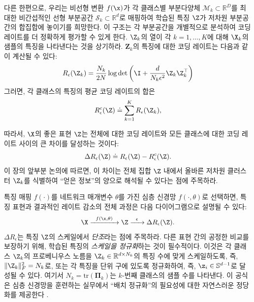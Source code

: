 \documentclass[../../book-main_ko.tex]{subfiles}
\begin{document}
다른 한편으로, 우리는 비선형 변환 $f(\x)$가 각 클래스별 부분다양체 $\mathcal{M}_k \subset \mathbb{R}^D$를 최대한 비간섭적인 선형 부분공간 $\mathcal{S}_k \subset \mathbb{R}^d$로 매핑하여 학습된 특징 $\Z$가 저차원 부분공간의 합집합에 놓이기를 희망한다. 이 구조는 각 부분공간을 개별적으로 분석하여 코딩 레이트를 더 정확하게 평가할 수 있게 한다. %
$\Z_k$의 열이 각 $k=1,\dots,K$에 대해 $\X_k$의 샘플의 특징을 나타낸다는 것을 상기하라. $\bm Z_k$의 특징에 대한 코딩 레이트는 다음과 같이 계산될 수 있다:
\begin{align}
    R_{\epsilon}(\Z_k) = \frac{N_k}{2N}\log\det\left(\I + \frac{d}{N_k\epsilon^{2}}\Z_k\Z_k^{\top}\right)
\end{align}
그러면, 각 클래스의 특징의 평균 코딩 레이트의 합은
\begin{equation}
	 R_{\epsilon}^c(\Z) \doteq \sum_{k=1}^K R_{\epsilon}(\Z_k),
	\label{chap4-eqn:compress-loss-eval}
\end{equation}

따라서, $\X$의 좋은 표현 $\Z$는 전체에 대한 코딩 레이트와 모든 클래스에 대한 코딩 레이트 사이의 큰 차이를 달성하는 것이다:
\begin{equation}
	\Delta R_{\epsilon}(\Z) \doteq R_{\epsilon}(\Z) - R_{\epsilon}^c(\Z).
	\label{chap4-eqn:coding-length-reduction}
\end{equation}
이 장의 앞부분 논의에 따르면, 이 차이는 전체 집합 $\Z$ 내에서 올바른 저차원 클러스터 $\Z_k$를 식별하여 ``얻은 정보''의 양으로 해석될 수 있다는 점에 주목하라.

특징 매핑 $f(\cdot)$를 네트워크 매개변수 $\theta$를 가진 심층 신경망 $f(\cdot,\theta)$로 선택하면, 특징 표현과 결과적인 레이트 감소의 전체 과정은 다음 다이어그램으로 설명될 수 있다:
\begin{equation}
	\X
	\xrightarrow{\hspace{2mm} f(\x, \theta)\hspace{2mm}} \Z  \xrightarrow{\hspace{2mm} \epsilon \hspace{2mm}} \Delta R_{\epsilon}(\Z).
	\label{chap4-eqn:flow}
\end{equation}
$\Delta R_{\epsilon}$는 특징 $\Z$의 스케일에서 {\em 단조}라는 점에 주목하라. 다른 표현 간의 공정한 비교를 보장하기 위해, 학습된 특징의 {\em 스케일을 정규화}하는 것이 필수적이다. 이것은 각 클래스 $\Z_k$의 프로베니우스 노름을 $\Z_k \in \mathbb R^{d \times N_k}$의 특징 수에 맞게 스케일하도록, 즉, $\|\Z_k\|_F^2 = N_k$로, 또는 각 특징을 단위 구에 있도록 정규화하여, 즉, $\z_i \in \mathbb{S}^{d-1}$로 달성될 수 있다. 여기서 $N_k=\mathrm{tr}(\bm \Pi_k)$는 $k$-번째 클래스의 샘플 수를 나타낸다. 이 공식은 심층 신경망을 훈련하는 실무에서 ``배치 정규화''의 필요성에 대한 자연스러운 정당화를 제공한다 \cite{ioffe2015batch}. %
\end{document}
